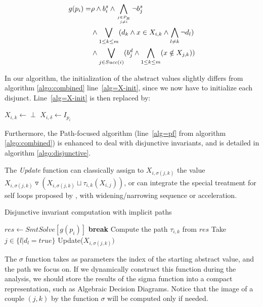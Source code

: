 \documentclass[preprint]{sigplanconf}
\newcommand{\widening}{\mathop{\triangledown}}
\begin{document}
\begin{eqnarray*}
g(p_i) = & \rho \wedge b_i^s \wedge 
\displaystyle\bigwedge_{j \in P_R \atop j \neq i} \neg b_j^s  \\
 & \wedge 
\displaystyle\bigvee_{1 \leq k \leq m} (d_k \wedge x \in X_{i,k} \wedge \bigwedge_{l \neq k}
\neg d_l) \\
 & \wedge
\displaystyle\bigvee_{j \in Succ(i)} 
(b_j^d \wedge \bigwedge_{1 \leq k \leq m} (x \notin X_{j,k}))
\end{eqnarray*}

In our algorithm, the initialization of the abstract values slightly differs from
algorithm \ref{algo:combined} line~\ref{alg=X-init}, since we now have to
initialize each disjunct. Line~\ref{alg=X-init} is then replaced by:
\begin{algorithm}[!h]
\begin{algorithmic}[1] 
	\STATE $X_{i,k} \gets \perp$
\ENDFOR
\STATE $X_{i,\delta} \gets I_{p_i}$
\end{algorithmic}
\end{algorithm}

Furthermore, the Path-focused algorithm (line~\ref{alg=pf} from algorithm
\ref{algo:combined}) is enhanced to deal with disjunctive invariants, and
is detailed in algorithm \ref{algo:disjunctive}.

The \emph{Update} function can classically assign to $X_{i,\sigma(j,k)}$ the
value $X_{i,\sigma(j,k)} \widening (X_{i,\sigma(j,k)} \sqcup
\tau_{i,k}(X_{i,j}))$, or can integrate the special treatment for self loops
proposed by \citet{Monniaux_Gonnord_SAS11}, with widening/narrowing sequence or
acceleration.

\begin{algorithm}[!h]
\caption{Disjunctive invariant computation with implicit paths}\label{gulwani2}
\label{algo:disjunctive}
\begin{algorithmic}[1] 
		\STATE $res \gets SmtSolve\left[g(p_i)\right]$
		\STATE \textbf{break}
	\ENDIF
	\STATE Compute the path $\tau_{i,k}$ from $res$ 
	\STATE Take $j \in \{ l | d_l = true\}$ 
	\STATE Update($X_{i,\sigma(j,k)})$
\ENDWHILE
\end{algorithmic}
\end{algorithm}

The $\sigma$ function takes as parameters the index of the starting abstract
value, and the path we focus on. If we dynamically construct this function
during the analysis, we should store the results of the sigma function into a
compact representation, such as Algebraic Decision Diagrams. Notice that the
image of a couple $(j,k)$ by the function $\sigma$ will be computed only if
needed.
\end{document}
